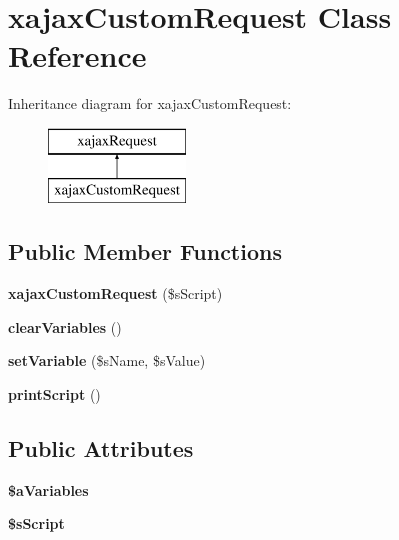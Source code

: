 \hypertarget{classxajaxCustomRequest}{
\section{xajaxCustomRequest Class Reference}
\label{classxajaxCustomRequest}
}
Inheritance diagram for xajaxCustomRequest:\begin{figure}[H]
\begin{center}
\leavevmode
\includegraphics[height=2.000000cm]{classxajaxCustomRequest}
\end{center}
\end{figure}
\subsection*{Public Member Functions}
\begin{DoxyCompactItemize}
\item 
\hypertarget{classxajaxCustomRequest_a8c3e61533c904b4923326ccd0abaa524}{
{\bfseries xajaxCustomRequest} (\$sScript)}
\label{classxajaxCustomRequest_a8c3e61533c904b4923326ccd0abaa524}

\item 
\hypertarget{classxajaxCustomRequest_a1a01fad2423e06424505feddd0981597}{
{\bfseries clearVariables} ()}
\label{classxajaxCustomRequest_a1a01fad2423e06424505feddd0981597}

\item 
\hypertarget{classxajaxCustomRequest_a55ac3a2f997d259fc9ddbe30d4e5db3c}{
{\bfseries setVariable} (\$sName, \$sValue)}
\label{classxajaxCustomRequest_a55ac3a2f997d259fc9ddbe30d4e5db3c}

\item 
\hypertarget{classxajaxCustomRequest_ad223744569cd9b0b33c69cddee6c4d22}{
{\bfseries printScript} ()}
\label{classxajaxCustomRequest_ad223744569cd9b0b33c69cddee6c4d22}

\end{DoxyCompactItemize}
\subsection*{Public Attributes}
\begin{DoxyCompactItemize}
\item 
\hypertarget{classxajaxCustomRequest_af5a58820ccdc9ce6c3d97a10f85ab2c3}{
{\bfseries \$aVariables}}
\label{classxajaxCustomRequest_af5a58820ccdc9ce6c3d97a10f85ab2c3}

\item 
\hypertarget{classxajaxCustomRequest_ad45f5386989cb5a2c32524a0b5b3a11c}{
{\bfseries \$sScript}}
\label{classxajaxCustomRequest_ad45f5386989cb5a2c32524a0b5b3a11c}

\end{DoxyCompactItemize}


